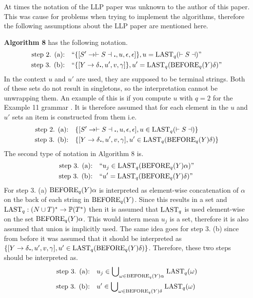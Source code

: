 At times the notation of the LLP paper \cite{Vagner2007} was unknown to the author of this paper. This was cause for problems when trying to implement the algorithms, therefore the following assumptions about the LLP paper \cite{Vagner2007} are mentioned here.

\textbf{Algorithm 8} \cite[13]{Vagner2007} has the following notation.
\begin{align*}
    \text{step 2. (a):}& \quad \text{``}\{[S' \to \vdash S \dashv \textbf{.}, u, \epsilon, \epsilon]\}, u = \text{LAST}_q(\vdash S \dashv)\text{''} \\
    \text{step 3. (b):}& \quad \text{``}\{[Y \to \delta \textbf{.}, u', v, \gamma]\}, u' = \text{LAST}_q(\text{BEFORE}_q(Y)\delta)\text{''}
\end{align*}    
In the context $u$ and $u'$ are used, they are supposed to be terminal strings. Both of these sets do not result in singletons, so the interpretation cannot be unwrapping them. An example of this is if you compute $u$ with $q=2$ for the Example 11 grammar \cite[14]{Vagner2007}. It is therefore assumed that for each element in the $u$ and $u'$ sets an item is constructed from them i.e.
\begin{align*}
    \text{step 2. (a):}& \quad \{[S' \to \vdash S \dashv \textbf{.}, u, \epsilon, \epsilon], u \in \text{LAST}_q(\vdash S \dashv)\} \\
    \text{step 3. (b):}& \quad \{[Y \to \delta \textbf{.}, u', v, \gamma], u' \in \text{LAST}_q(\text{BEFORE}_q(Y)\delta)\}
\end{align*}
The second type of notation in Algorithm 8 is.
\begin{align*}
    \text{step 3. (a):}& \quad \text{``} u_j \in \text{LAST}_q(\text{BEFORE}_q(Y) \alpha)\text{''} \\
    \text{step 3. (b):}& \quad \text{``} u' = \text{LAST}_q(\text{BEFORE}_q(Y)\delta)\text{''}
\end{align*}    
For step 3. (a) $\text{BEFORE}_q(Y) \alpha$ is interpreted as element-wise concatenation of $\alpha$ on the back of each string in $\text{BEFORE}_q(Y)$. Since this results in a set and $\text{LAST}_q: (N \cup T)^* \to \mathbb{P}(T^*)$ then it is assumed that $\text{LAST}_q$ is used element-wise on the set $\text{BEFORE}_q(Y) \alpha$. This would intern mean $u_j$ is a set, therefore it is also assumed that union is implicitly used. The same idea goes for step 3. (b) since from before it was assumed that it should be interpreted as $\{[Y \to \delta \textbf{.}, u', v, \gamma], u' \in \text{LAST}_q(\text{BEFORE}_q(Y)\delta)\}$. Therefore, these two steps should be interpreted as.
\begin{align*}
    \text{step 3. (a):}& \quad u_j \in \text{$\bigcup$}_{\omega \in \text{BEFORE}_q(Y) \alpha} \; \text{LAST}_q(\omega) \\
    \text{step 3. (b):}& \quad  u' \in \text{$\bigcup$}_{\omega \in \text{BEFORE}_q(Y) \delta} \; \text{LAST}_q(\omega)
\end{align*}